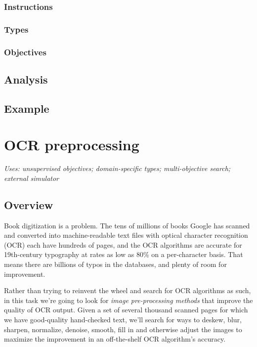 \documentclass[12pt]{article}
\begin{document}
\subsubsection{Instructions}

\subsubsection{Types}

\subsubsection{Objectives}

\subsection{Analysis}

\subsection{Example}


\section{OCR preprocessing}

\textit{Uses: unsupervised objectives; domain-specific types; multi-objective search; external simulator}

\subsection{Overview}

Book digitization is a problem. The tens of millions of books Google has scanned and converted into machine-readable text files with optical character recognition (OCR) each have hundreds of pages, and the OCR algorithms are accurate for 19th-century typography at rates as low as 80\% on a per-character basis. That means there are billions of typos in the databases, and plenty of room for improvement.

Rather than trying to reinvent the wheel and search for OCR algorithms as such, in this task we're going to look for \emph{image pre-processing methods} that improve the quality of OCR output. Given a set of several thousand scanned pages for which we have good-quality hand-checked text, we'll search for ways to deskew, blur, sharpen, normalize, denoise, smooth, fill in and otherwise adjust the images to maximize the improvement in an off-the-shelf OCR algorithm's accuracy.
\end{document}
